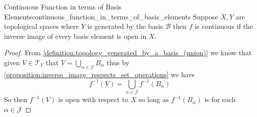 \begin{proposition}{Continuous Function in terms of Basis
Elements}{continuous_function_in_terms_of_basis_elements}
Suppose \( X, Y \) are topological spaces where \( Y \) is generated by the
basis \( \mathcal{ B }   \) then \( f \) is continuous if the inverse image of
every basis element is open in \( X \).
\end{proposition}
\begin{proof}
    From \ref{definition:topology_generated_by_a_basis_(union)} we know that
    given \( V \in  \mathcal{ T } _{ Y }    \) that \( V =  \bigcup _{ \alpha
    \in \mathcal{ J }   } B _{ \alpha  }  \) thus by
    \ref{proposition:inverse_image_respects_set_operations} we have
    \[
    f ^{-1} \left( V \right) = \bigcup _{ \alpha \in \mathcal{ J }   } f ^{-1}
    \left( B _{ \alpha  }  \right) 
    \]
    So then \( f ^{-1} \left( V \right)  \) is open with respect to \( X \) so
    long as \( f ^{-1} \left( B _{ \alpha  }  \right)  \) is for each \( \alpha
    \in  \mathcal{ J }  \) 
\end{proof}
